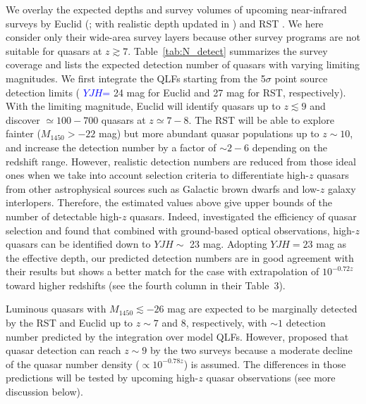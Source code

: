 \documentclass[twocolumn, twocolappendix]{aastex63}
\newcommand{\Muv}{M_{1450}}
\newcommand{\blue}[1]{\textcolor{blue}{ #1}}
\begin{document}
\begin{CJK*}{UTF8}{gbsn}
We overlay the expected depths and survey volumes of upcoming near-infrared surveys by
Euclid (\citealt{2011arXiv1110.3193L}; with realistic depth updated in \citealt{2019Barnett}) and RST \citep{2019arXiv190205569A}.
We here consider only their wide-area survey layers because other survey programs are not suitable for quasars at $z\gtrsim 7$.
Table~\ref{tab:N_detect} summarizes the survey coverage and lists the expected detection number of quasars with varying limiting magnitudes.
We first integrate the QLFs starting from the 5$\sigma$ point source detection limits (\blue{$YJH$=} 24 mag for Euclid and 27 mag for RST, respectively).
With the limiting magnitude, Euclid will identify quasars up to $z\lesssim 9$ and discover $\simeq 100-700$ quasars at $z\simeq 7-8$.
The RST will be able to explore fainter ($\Muv>-22$ mag) but more abundant quasar populations up to $z\sim 10$,
and increase the detection number by a factor of $\sim 2-6$ depending on the redshift range.
However, realistic detection numbers are reduced from those ideal ones when we take into account selection criteria to differentiate 
high-$z$ quasars from other astrophysical sources such as Galactic brown dwarfs and low-$z$ galaxy interlopers.
Therefore, the estimated values above give upper bounds of the number of detectable high-$z$ quasars.
Indeed, \citet{2019Barnett} investigated the efficiency of quasar selection and
found that combined with ground-based optical observations,
high-$z$ quasars can be identified down to $YJH \sim$ 23 mag.
Adopting $YJH=23$ mag as the effective depth, %
our predicted detection numbers are in good agreement with their results but shows a better match for the case with extrapolation of $10^{-0.72z}$
toward higher redshifts (see the fourth column in their Table~3).



Luminous quasars with $\Muv \lesssim -26$ mag are expected to be marginally detected by the RST and Euclid up to $z\sim 7$ and 8, respectively,
with $\sim 1$ detection number predicted by the integration over model QLFs.
However, \citet{2019BAAS...51c.121F} proposed that quasar detection can reach $z\sim 9$ by the two surveys
because a moderate decline of the quasar number density ($\propto 10^{-0.78z}$) is assumed.
The differences in those predictions will be tested by upcoming high-$z$ quasar observations (see more discussion below).




\end{CJK*}
\end{document}
